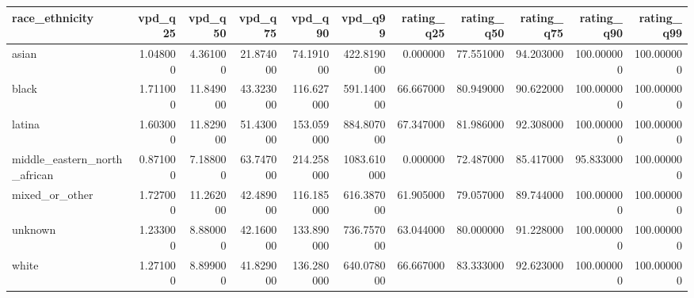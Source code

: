 \begin{tabular}{lrrrrrrrrrr}
\toprule
race_ethnicity & vpd_q25 & vpd_q50 & vpd_q75 & vpd_q90 & vpd_q99 & rating_q25 & rating_q50 & rating_q75 & rating_q90 & rating_q99 \\
\midrule
asian & 1.048000 & 4.361000 & 21.874000 & 74.191000 & 422.819000 & 0.000000 & 77.551000 & 94.203000 & 100.000000 & 100.000000 \\
black & 1.711000 & 11.849000 & 43.323000 & 116.627000 & 591.140000 & 66.667000 & 80.949000 & 90.622000 & 100.000000 & 100.000000 \\
latina & 1.603000 & 11.829000 & 51.430000 & 153.059000 & 884.807000 & 67.347000 & 81.986000 & 92.308000 & 100.000000 & 100.000000 \\
middle_eastern_north_african & 0.871000 & 7.188000 & 63.747000 & 214.258000 & 1083.610000 & 0.000000 & 72.487000 & 85.417000 & 95.833000 & 100.000000 \\
mixed_or_other & 1.727000 & 11.262000 & 42.489000 & 116.185000 & 616.387000 & 61.905000 & 79.057000 & 89.744000 & 100.000000 & 100.000000 \\
unknown & 1.233000 & 8.880000 & 42.160000 & 133.890000 & 736.757000 & 63.044000 & 80.000000 & 91.228000 & 100.000000 & 100.000000 \\
white & 1.271000 & 8.899000 & 41.829000 & 136.280000 & 640.078000 & 66.667000 & 83.333000 & 92.623000 & 100.000000 & 100.000000 \\
\bottomrule
\end{tabular}
